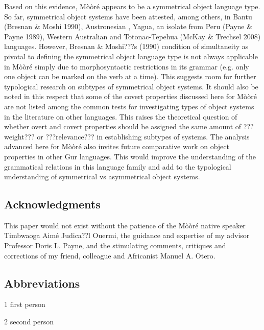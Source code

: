 \documentclass[output=paper]{langsci/langscibook}
\begin{document}
{{{{{{{Based on this evidence, M\`{o}\`{o}r\'{e} appears to be a symmetrical object language type. So far, symmetrical object systems have been attested, among others, in Bantu (Bresnan \& Moshi 1990), Austronesian \citep{Donohue1996}, Yagua, an isolate from Peru (Payne \& Payne 1989), Western Australian \citep{Dench1995} and Totonac-Tepehua (McKay \& Trechsel 2008) languages. However, Bresnan \& Moshi???s (1990)  condition of simultaneity as pivotal to defining the symmetrical object language type is not always applicable in M\`{o}\`{o}r\'{e} simply due to morphosyntactic restrictions in its grammar (e.g. only one object can be marked on the verb at a time). This suggests room for further typological research on subtypes of symmetrical object systems. It should also be noted in this respect that some of the covert properties discussed here for M\`{o}\`{o}r\'{e} are not listed among the common tests for investigating types of object systems in the literature on other languages. This raises the theoretical question of whether overt and covert properties should be assigned the same amount of ???weight??? or ???relevance??? in establishing subtypes of systems. The analysis advanced here for M\`{o}\`{o}r\'{e} also invites future comparative work on object properties in other Gur languages. This would improve the understanding of the grammatical relations in this language family and add to the typological understanding of symmetrical vs asymmetrical object systems.

\subsection{Acknowledgments}

This paper would not exist without the patience of the M\`{o}\`{o}r\'{e} native speaker Timbwaoga Aim\'{e} Judica??l Ouermi, the guidance and expertise of my advisor Professor Doris L. Payne, and the stimulating comments, critiques and corrections of my friend, colleague and Africanist Manuel A. Otero. 

\subsection{Abbreviations}
\begin{styleTabellenInhalt}
1  first person
\end{styleTabellenInhalt}

\begin{styleTabellenInhalt}
2  second person
\end{styleTabellenInhalt}

}}}}}}}
\end{document}
